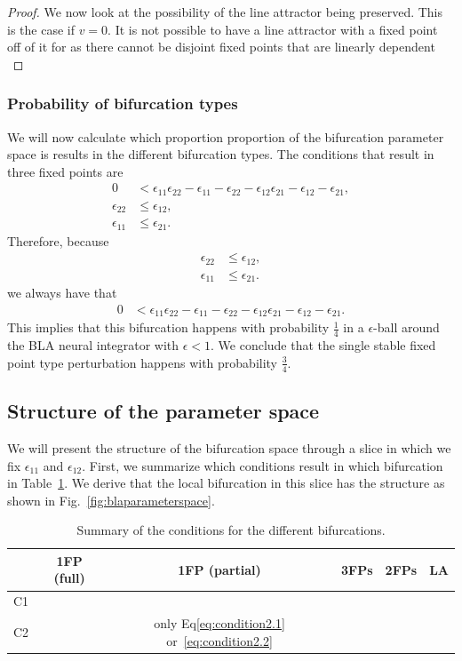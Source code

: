\documentclass{article} %
\newcounter{ct}
\newcommand{\cmark}{\ding{51}}%
\newcommand{\xmark}{\ding{55}}%
\theoremstyle{definition}
\theoremstyle{remark}
\begin{document}
\begin{proof}
We now look at the possibility of the line attractor being preserved.
This is the case if \(v = 0\).
It is not possible to have a line attractor with a fixed point off of it for as there cannot be disjoint fixed points that are linearly dependent \citep[Lemma 5.2]{morrison2024diversity}
\end{proof}




\subsubsection{Probability of bifurcation types}\label{sec:supp:probbla}
We will now calculate which proportion proportion of the bifurcation parameter space is results in the different bifurcation types.
The conditions  that result in three fixed points are
\begin{align*}
0 &< \epsilon_{11}\epsilon_{22}-\epsilon_{11}-\epsilon_{22}-\epsilon_{12}\epsilon_{21}-\epsilon_{12}-\epsilon_{21},\\
\epsilon_{22} &\leq \epsilon_{12},\\
\epsilon_{11} &\leq \epsilon_{21}.
\end{align*}Therefore, because
\begin{align*}
\epsilon_{22} &\leq \epsilon_{12},\\
\epsilon_{11} &\leq \epsilon_{21}.
\end{align*}we always have that
\begin{align*}
0 &< \epsilon_{11}\epsilon_{22}-\epsilon_{11}-\epsilon_{22}-\epsilon_{12}\epsilon_{21}-\epsilon_{12}-\epsilon_{21}.
\end{align*}This implies that this bifurcation happens with probability \(\frac{1}{4}\)  in a \(\epsilon\)-ball around the BLA neural integrator with \(\epsilon<1\).
We conclude that the single stable fixed point type perturbation happens with probability \(\frac{3}{4}\).


\subsection{Structure of the parameter space}
We will present the structure of the bifurcation space through a slice in which we fix  \(\epsilon_{11}\) and \(\epsilon_{12}\).
First, we summarize which conditions result in which bifurcation in Table~\ref{tab:bifs}.
We derive that the local bifurcation in this slice  has the structure as shown in Fig.~\ref{fig:blaparameterspace}.
\begin{table}[H]
\caption{Summary of the conditions for the different bifurcations.}\label{tab:bifs}
\centering
\bgroup
\def\arraystretch{1.52}
\begin{tabular}{|c||c|c|c|c|c|}
\hline
& 1FP (full) 		& 1FP (partial) & 3FPs & 2FPs & LA  \\\hline \hline
C1 & \cmark	 	& \xmark 	 & \cmark & \xmark & \xmark \\\hline
C2 & \xmark 		& only Eq\ref{eq:condition2.1} or~\ref{eq:condition2.2}  	 & \cmark & \cmark& \xmark \\\hline
\end{tabular}
\egroup
\end{table}
\end{document}
